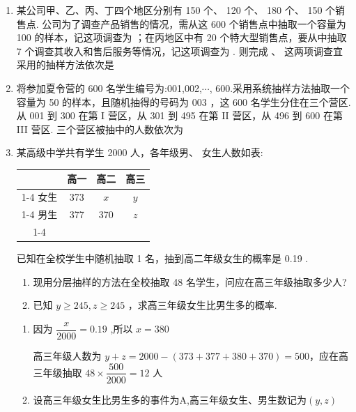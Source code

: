 \begin{enumerate}
    \item 某公司甲、乙、丙、丁四个地区分别有 150 个、 120 个、 180 个、 150 个销售点. 公司为了调查产品销售的情况，需从这 600 个销售点中抽取一个容量为 100 的样本，记这项调查为  ；在丙地区中有 20 个特大型销售点，要从中抽取 7 个调查其收入和售后服务等情况，记这项调查为  . 则完成  、  这两项调查宜采用的抽样方法依次是
    
    \item 将参加夏令营的 600 名学生编号为:001,002,$\cdots$, 600.采用系统抽样方法抽取一个容量为 50 的样本，且随机抽得的号码为 003 ，这 600 名学生分住在三个营区. 从 001 到 300 在第 I 营区，从 301 到 495 在第 II 营区，从 496 到 600 在第 III 营区. 三个营区被抽中的人数依次为
    
    \item 某高级中学共有学生 2000 人，各年级男、 女生人数如表:
    \begin{center}
    \begin{tabular}{|c|c|c|c|}
    \hline
      & 高一 & 高二 & 高三 \\
    \cline{1-4}
    女生 & 373 & $x$ & $y$ \\
    \cline{1-4}
    男生 & 377 & 370 & $z$ \\
    \cline{1-4}
    \hline
    \end{tabular}
    \end{center}
    已知在全校学生中随机抽取 1 名，抽到高二年级女生的概率是 0.19 .
    \begin{enumerate}
        \item 现用分层抽样的方法在全校抽取 48 名学生，问应在高三年级抽取多少人?
        \item 已知 $y \geq  {245},z \geq  {245}$ ，求高三年级女生比男生多的概率.
    \end{enumerate}
    \begin{jieda}
        \begin{enumerate}
            \item 因为 $\dfrac{x}{2000} = {0.19}$ ,所以 $x = {380}$
            
            高三年级人数为 $y + z = {2000} - \left( {{373} + {377} + {380} + {370}}\right)  = {500}$，应在高三年级抽取 ${48} \times  \dfrac{500}{2000} = {12}$ 人
            
            \item 设高三年级女生比男生多的事件为A,高三年级女生、男生数记为$(y,z)$
            

\end{enumerate}
\end{jieda}
\end{enumerate}
